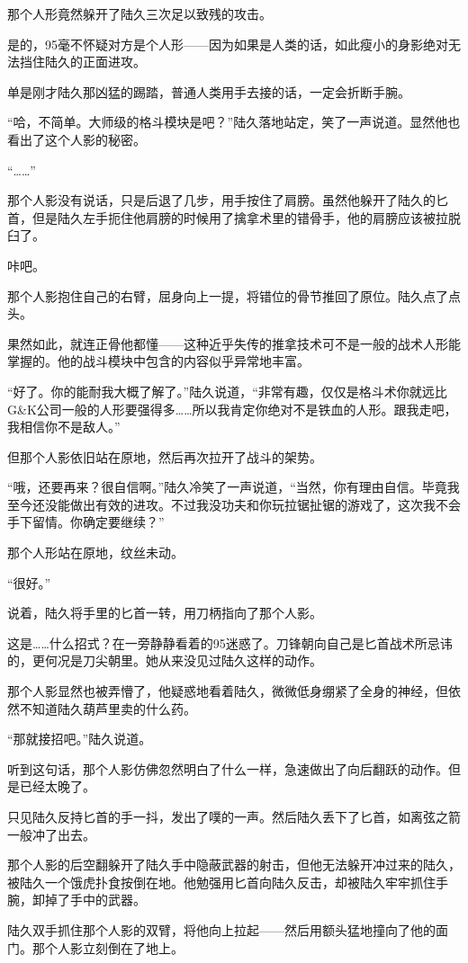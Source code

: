 那个人形竟然躲开了陆久三次足以致残的攻击。

是的，95毫不怀疑对方是个人形——因为如果是人类的话，如此瘦小的身影绝对无法挡住陆久的正面进攻。

单是刚才陆久那凶猛的踢踏，普通人类用手去接的话，一定会折断手腕。

“哈，不简单。大师级的格斗模块是吧？”陆久落地站定，笑了一声说道。显然他也看出了这个人影的秘密。

“……”

那个人影没有说话，只是后退了几步，用手按住了肩膀。虽然他躲开了陆久的匕首，但是陆久左手扼住他肩膀的时候用了擒拿术里的错骨手，他的肩膀应该被拉脱臼了。

咔吧。

那个人影抱住自己的右臂，屈身向上一提，将错位的骨节推回了原位。陆久点了点头。

果然如此，就连正骨他都懂——这种近乎失传的推拿技术可不是一般的战术人形能掌握的。他的战斗模块中包含的内容似乎异常地丰富。

“好了。你的能耐我大概了解了。”陆久说道，“非常有趣，仅仅是格斗术你就远比G\&K公司一般的人形要强得多……所以我肯定你绝对不是铁血的人形。跟我走吧，我相信你不是敌人。”

但那个人影依旧站在原地，然后再次拉开了战斗的架势。

“哦，还要再来？很自信啊。”陆久冷笑了一声说道，“当然，你有理由自信。毕竟我至今还没能做出有效的进攻。不过我没功夫和你玩拉锯扯锯的游戏了，这次我不会手下留情。你确定要继续？”

那个人形站在原地，纹丝未动。

“很好。”

说着，陆久将手里的匕首一转，用刀柄指向了那个人影。

这是……什么招式？在一旁静静看着的95迷惑了。刀锋朝向自己是匕首战术所忌讳的，更何况是刀尖朝里。她从来没见过陆久这样的动作。

那个人影显然也被弄懵了，他疑惑地看着陆久，微微低身绷紧了全身的神经，但依然不知道陆久葫芦里卖的什么药。

“那就接招吧。”陆久说道。

听到这句话，那个人影仿佛忽然明白了什么一样，急速做出了向后翻跃的动作。但是已经太晚了。

只见陆久反持匕首的手一抖，发出了噗的一声。然后陆久丢下了匕首，如离弦之箭一般冲了出去。

那个人影的后空翻躲开了陆久手中隐蔽武器的射击，但他无法躲开冲过来的陆久，被陆久一个饿虎扑食按倒在地。他勉强用匕首向陆久反击，却被陆久牢牢抓住手腕，卸掉了手中的武器。

陆久双手抓住那个人影的双臂，将他向上拉起——然后用额头猛地撞向了他的面门。那个人影立刻倒在了地上。

